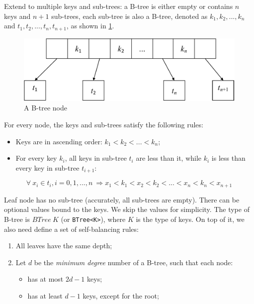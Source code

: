 \documentclass[b5paper]{article}
\begin{document}
Extend to multiple keys and sub-trees: a B-tree is either empty or contains $n$ keys and $n + 1$ sub-trees, each sub-tree is also a B-tree, denoted as $k_1, k_2, ..., k_n$ and $t_1, t_2, ..., t_n, t_{n+1}$, as shown in \cref{fig:btree-node}.

\begin{figure}[htbp]
  \centering
  \includegraphics[scale=0.5, page=1]{img/btrees}
  \caption{A B-tree node}
  \label{fig:btree-node}
\end{figure}

For every node, the keys and sub-trees satisfy the following rules:

\begin{itemize}
\item Keys are in ascending order: $k_1 < k_2 < ... < k_n$;
\item For every key $k_i$, all keys in sub-tree $t_i$ are less than it, while $k_i$ is less than every key in sub-tree $t_{i+1}$:
\end{itemize}

\begin{equation}
\forall\ x_i \in t_i, i=0, 1, ..., n\ \Rightarrow x_1 < k_1 < x_2 < k_2 < ... < x_n < k_n < x_{n+1}
\label{eq:btree-order}
\end{equation}

Leaf node has no sub-tree (accurately, all sub-trees are empty). There can be optional values bound to the keys. We skip the values for simplicity. The type of B-tree is $BTree\ K$ (or \texttt{BTree<K>}), where $K$ is the type of keys. On top of it, we also need define a set of self-balancing rules:

\begin{enumerate}
\item All leaves have the same depth;
\item Let $d$ be the {\em minimum degree} number of a B-tree, such that each node:
  \begin{itemize}
  \item has at most $2d - 1$ keys;
  \item has at least $d - 1$ keys, except for the root;
  \end{itemize}
\end{enumerate}
\end{document}

